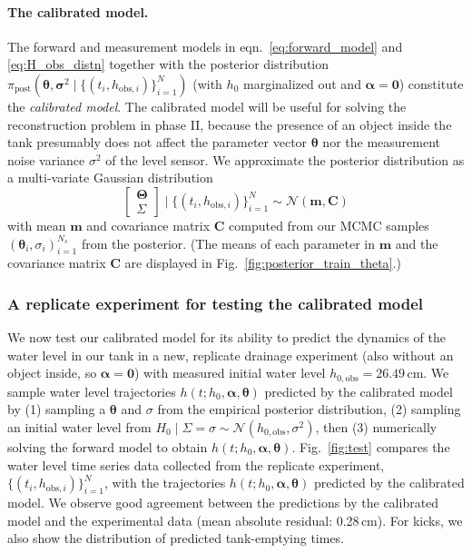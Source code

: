 \documentclass[openacc]{rsproca_new}%
\newcommand\thedata {$\{(t_i,h_{\text{obs}, i})\}_{i=1}^{N}$\xspace}
\newcommand\thedatanomath {\{(t_i,h_{\text{obs}, i})\}_{i=1}^{N}}
\newcommand\themodel {$h(t; h_0, \boldsymbol \alpha, \boldsymbol\theta)$\xspace}
\begin{document}
\paragraph{The calibrated model.} The forward and measurement models in eqn.~\ref{eq:forward_model} and \ref{eq:H_obs_distn} together with the posterior distribution $\pi_{\text{post}}(\boldsymbol \theta, \boldsymbol \sigma^2 \mid \thedatanomath)$ (with $h_0$ marginalized out and $\boldsymbol \alpha=\mathbf{0}$) constitute the \emph{calibrated model}.
 The calibrated model will be useful for solving the reconstruction problem in phase II, because the presence of an object inside the tank presumably does not affect the parameter vector $\boldsymbol \theta$ nor the measurement noise variance $\sigma^2$ of the level sensor.
We approximate the posterior distribution as a multi-variate Gaussian distribution
\begin{equation}
	\begin{bmatrix} \boldsymbol \Theta \\ \Sigma \end{bmatrix} \mid \thedatanomath \sim \mathcal{N}(\mathbf{m}, \mathbf{C}) \label{eq:post_theta_sigma}
\end{equation}
with mean $\mathbf{m}$ and covariance matrix $\mathbf{C}$ computed from our MCMC samples $(\boldsymbol \theta_i, \sigma_i)_{i=1}^{N_s}$ from the posterior. 
(The means of each parameter in $\mathbf{m}$ and the covariance matrix $\mathbf{C}$ are displayed in Fig.~\ref{fig:posterior_train_theta}.)

\subsubsection{A replicate experiment for testing the calibrated model}
We now test our calibrated model for its ability to predict the dynamics of the water level in our tank in a new, replicate drainage experiment (also without an object inside, so $\boldsymbol \alpha=\mathbf{0}$) with measured initial water level $h_{0, \text{obs}}=26.49$\,cm. 
We sample water level trajectories \themodel predicted by the calibrated model by (1) sampling a $\boldsymbol \theta$ and $\sigma$ from the empirical posterior distribution, (2) sampling an initial water level from $H_0 \mid \Sigma=\sigma \sim \mathcal{N}(h_{0, \text{obs}}, \sigma^2)$, then (3) numerically solving the forward model to obtain \themodel.
Fig.~\ref{fig:test} compares the water level time series data collected from the replicate experiment, \thedata, with the trajectories \themodel predicted by the calibrated model. We observe good agreement between the predictions by the calibrated model and the experimental data (mean absolute residual: 0.28\,cm). For kicks, we also show the distribution of predicted tank-emptying times.
\end{document}
